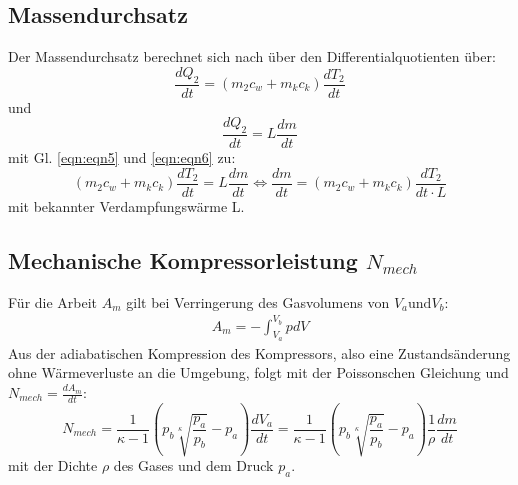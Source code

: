 \subsection{Massendurchsatz}
\label{sec:Massendurchsatz}
Der Massendurchsatz berechnet sich nach \cite{AnleitungV206} über den Differentialquotienten über:
\begin{equation}
  \frac{dQ_2}{dt} = (m_2c_w + m_kc_k) \frac{dT_2}{dt}
  \label{eqn:eqn5}
\end{equation}
und
\begin{equation}
  \frac{dQ_2}{dt} = L \frac{dm}{dt}
  \label{eqn:eqn6}
\end{equation}
mit Gl. \ref{eqn:eqn5} und \ref{eqn:eqn6} zu:
\begin{equation}
  (m_2c_w + m_kc_k) \frac{dT_2}{dt} = L \frac{dm}{dt} \Leftrightarrow  \frac{dm}{dt} = (m_2c_w + m_kc_k) \frac{dT_2}{dt \cdot L}
  \label{eqn:eqn7}
\end{equation}
mit bekannter Verdampfungswärme L.

\subsection{Mechanische Kompressorleistung $N_{mech}$}
\label{sec:Kompleistung}
Für die Arbeit $A_m$ gilt bei Verringerung des Gasvolumens von $V_a \textrm{und} V_b$:
\begin{align}
  A_m = - \int_{V_a}^{V_b} pdV
  \label{eqn:eqn8}
\end{align}
Aus der adiabatischen Kompression des Kompressors, also eine Zustandsänderung ohne Wärmeverluste an die Umgebung, folgt mit der Poissonschen Gleichung und $N_{mech} = \frac{dA_m}{dt}$:
\begin{equation}
  N_{mech} = \frac{1}{\kappa - 1} \left( p_b \sqrt[\kappa]{\frac{p_a}{p_b}} - p_a \right) \frac{dV_a}{dt} = \frac{1}{\kappa - 1} \left( p_b \sqrt[\kappa]{\frac{p_a}{p_b}} - p_a \right) \frac{1}{\rho} \frac{dm}{dt}
  \label{eqn:eqn9}
\end{equation}
mit der Dichte $\rho$ des Gases und dem Druck $p_a$.
